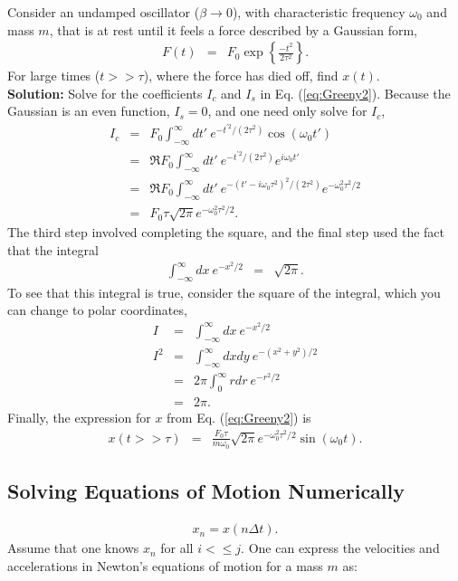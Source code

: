 \example
Consider an undamped oscillator ($\beta\rightarrow 0$), with characteristic frequency $\omega_0$ and mass $m$, that is at rest until it feels a force described by a Gaussian form,
\begin{eqnarray*}
F(t)&=&F_0 \exp\left\{\frac{-t^2}{2\tau^2}\right\}.
\end{eqnarray*}
For large times ($t>>\tau$), where the force has died off, find $x(t)$.\\
{\bf Solution:} Solve for the coefficients $I_c$ and $I_s$ in Eq. (\ref{eq:Greeny2}). Because the Gaussian is an even function, $I_s=0$, and one need only solve for $I_c$,
\begin{eqnarray*}
I_c&=&F_0\int_{-\infty}^\infty dt'~e^{-t^{\prime 2}/(2\tau^2)}\cos(\omega_0 t')\\
&=&\Re F_0 \int_{-\infty}^\infty dt'~e^{-t^{\prime 2}/(2\tau^2)}e^{i\omega_0 t'}\\
&=&\Re F_0 \int_{-\infty}^\infty dt'~e^{-(t'-i\omega_0\tau^2)^2/(2\tau^2)}e^{-\omega_0^2\tau^2/2}\\
&=&F_0\tau \sqrt{2\pi} e^{-\omega_0^2\tau^2/2}.
\end{eqnarray*}
The third step involved completing the square, and the final step used the fact that the integral
\begin{eqnarray*}
\int_{-\infty}^\infty dx~e^{-x^2/2}&=&\sqrt{2\pi}.
\end{eqnarray*}
To see that this integral is true, consider the square of the integral, which you can change to polar coordinates,
\begin{eqnarray*}
I&=&\int_{-\infty}^\infty dx~e^{-x^2/2}\\
I^2&=&\int_{-\infty}^\infty dxdy~e^{-(x^2+y^2)/2}\\
&=&2\pi\int_0^\infty rdr~e^{-r^2/2}\\
&=&2\pi.
\end{eqnarray*}
Finally, the expression for $x$ from Eq. (\ref{eq:Greeny2}) is
\begin{eqnarray*}
x(t>>\tau)&=&\frac{F_0\tau}{m\omega_0} \sqrt{2\pi} e^{-\omega_0^2\tau^2/2}\sin(\omega_0t).
\end{eqnarray*}


\exampleend

\subsection{Solving Equations of Motion Numerically}
\begin{eqnarray}
x_n=x(n\Delta t).
\end{eqnarray}
Assume that one knows $x_n$ for all $i<\le j$. One can express the velocities and accelerations in Newton's equations of motion for a mass $m$ as:

